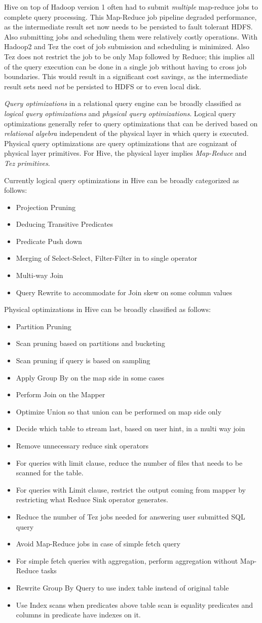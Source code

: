 \documentclass{vldb}
\newcommand{\bi}{\begin{itemize}}
\newcommand{\ei}{\end{itemize}}
\newcommand{\ii}{\item}
\begin{document}
Hive on top of Hadoop version 1 often had to submit \textit{multiple} map-reduce jobs to complete query processing. 
This Map-Reduce job pipeline degraded performance, as the intermediate result set now needs to be persisted to fault tolerant HDFS. 
Also submitting jobs and scheduling them were relatively costly operations. 
With Hadoop2 and Tez the cost of job submission and scheduling is minimized. 
Also Tez does not restrict the job to be only Map followed by Reduce; 
this implies all of the query execution can be done in a single job without having to cross job boundaries. 
This would result in a significant cost savings, as the intermediate result sets need \textit{not} be persisted to HDFS or to even local disk.

\textit{Query optimizations} in a relational query engine can be broadly classified as \textit{logical query optimizations} and \textit{physical query optimizations}. 
Logical query optimizations generally refer to query optimizations that can be derived based on \textit{relational algebra} independent of the physical layer in which query is executed. 
Physical query optimizations are query optimizations that are cognizant of physical layer primitives. 
For Hive, the physical layer implies \textit{Map-Reduce} and \textit{Tez primitives}.

Currently logical query optimizations in Hive can be broadly categorized as follows:

\bi
\ii Projection Pruning
\ii Deducing Transitive Predicates
\ii Predicate Push down
\ii Merging of Select-Select, Filter-Filter in to single operator
\ii Multi-way Join
\ii Query Rewrite to accommodate for Join skew on some column values
\ei

Physical optimizations in Hive can be broadly classified as follows:

\bi
\ii Partition Pruning
\ii Scan pruning based on partitions and bucketing
\ii Scan pruning if query is based on sampling
\ii Apply Group By on the map side in some cases
\ii Perform Join on the Mapper
\ii Optimize Union so that union can be performed on map side only
\ii Decide which table to stream last, based on user hint, in a multi way join
\ii Remove unnecessary reduce sink operators
\ii For queries with limit clause, reduce the number of files that needs to be scanned for the table.
\ii For queries with Limit clause, restrict the output coming from mapper by restricting what Reduce Sink operator generates.
\ii Reduce the number of Tez jobs needed for answering user submitted SQL query
\ii Avoid Map-Reduce jobs in case of simple fetch query
\ii For simple fetch queries with aggregation, perform aggregation without Map-Reduce tasks
\ii Rewrite Group By Query to use index table instead of original table
\ii Use Index scans when predicates above table scan is equality predicates and columns in predicate have indexes on it.
\ei
\end{document}
